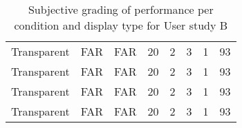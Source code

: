 \documentclass[preprint]{vgtc}               %
\begin{document}
\begin{table}[h]

    \caption{Subjective grading of performance per condition and display
type for User study B}
    \label{tab:seznam}
    \centering
    \begin{tabular}{c|c c|c c c c | c}
        \hline
         Transparent & FAR & FAR & 20 & 2 & 3 & 1 & 93 \\
         Transparent & FAR & FAR & 20 & 2 & 3 & 1 & 93 \\
         Transparent & FAR & FAR & 20 & 2 & 3 & 1 & 93 \\
         Transparent & FAR & FAR & 20 & 2 & 3 & 1 & 93 \\
         \hline
    \end{tabular}
\end{table}

\cite{6402557}
\cite{7893336}
\cite{bababekova2011font}



\end{document}
